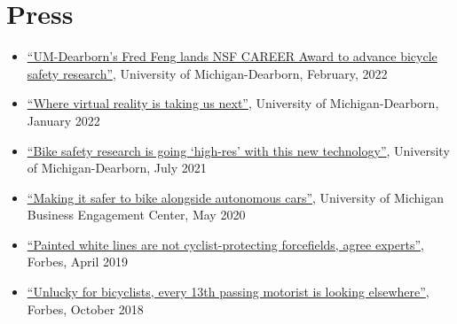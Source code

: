 \documentclass[11pt]{article}
\newenvironment{main}
{\begin{adjustwidth}{3em}{}}
{\end{adjustwidth}}
\begin{document}
\section*{Press}
\begin{main}

\begin{itemize}
    \item \href{}{``UM-Dearborn's Fred Feng lands NSF CAREER Award to advance bicycle safety research''}, University of Michigan-Dearborn, February, 2022
    \item \href{https://umdearborn.edu/news/articles/where-virtual-reality-taking-us-next}{``Where virtual reality is taking us next''}, University of Michigan-Dearborn, January 2022
    \item \href{https://umdearborn.edu/news/articles/bike-safety-research-going-high-res-new-technology}{``Bike safety research is going `high-res' with this new technology''}, University of Michigan-Dearborn, July 2021
    \item \href{https://bec.umich.edu/making-it-safer-to-bike-alongside-autonomous-cars/}{``Making it safer to bike alongside autonomous cars''}, University of Michigan Business Engagement Center, May 2020
    \item \href{https://www.forbes.com/sites/carltonreid/2019/04/16/painted-white-lines-are-not-cyclist-protecting-forcefields-agree-experts/}{``Painted white lines are not cyclist-protecting forcefields, agree experts''}, Forbes, April 2019
    \item \href{https://www.forbes.com/sites/carltonreid/2018/10/10/unlucky-for-bicyclists-every-13th-passing-motorist-is-looking-elsewhere/}{``Unlucky for bicyclists, every 13th passing motorist is looking elsewhere''}, Forbes, October 2018
\end{itemize}


\end{main}
\end{document}
